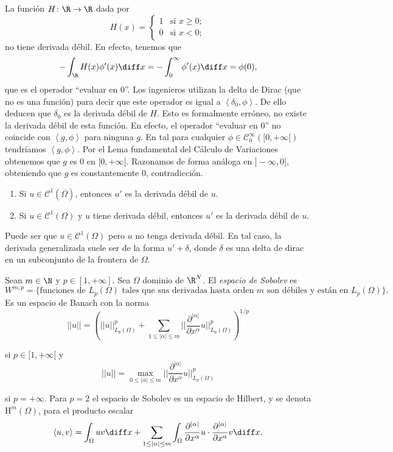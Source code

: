\documentclass{article}
\begin{document}
\begin{ex}
  La función $H \colon \R \to \R$ dada por
  \[ H(x) =
    \begin{cases}
      1 & \text{si } x \ge 0; \\
      0 & \text{si } x < 0;
    \end{cases}
  \]
  no tiene derivada débil. En efecto, tenemos que
  \[ - \int_{\R} H(x)\phi'(x) \diff x = - \int_0^{\infty} \phi'(x) \diff x = \phi(0),\] que es el
  operador ``evaluar en $0$''. Los ingenieros utilizan la delta de Dirac (que no es una función)
  para decir que este operador es igual a $\left\langle \delta_0, \phi \right\rangle$. De ello
  deducen que $\delta_0$ es la derivada débil de $H$. Esto es formalmente erróneo, no existe la
  derivada débil de esta función. En efecto, el operador ``evaluar en $0$'' no coincide con
  $\left\langle g, \phi \right\rangle$ para ninguna $g$. En tal para cualquier
  $\phi \in \mathcal{C}_0^{\infty}([0, +\infty[)$ tendríamos $\left\langle g, \phi
  \right\rangle$. Por el Lema fundamental del Cálculo de Variaciones obtenemos que $g$ es $0$ en
  $[0,+\infty[$. Razonamos de forma análoga en $]-\infty, 0]$, obteniendo que $g$ es constantemente
  $0$, contradicción.
\end{ex}

\begin{proposition}
  \begin{enumerate}
  \item Si $u \in \mathcal{C}^1(\overline{\Omega})$, entonces $u'$ es la derivada débil de $u$.
  \item Si $u \in \mathcal{C}^1(\Omega)$ y $u$ tiene derivada débil, entonces $u'$ es la derivada
    débil de $u$.
  \end{enumerate}
\end{proposition}

Puede ser que $u \in \mathcal{C}^1(\Omega)$ pero $u$ no tenga derivada débil. En tal caso, la
derivada generalizada suele ser de la forma $u' + \delta$, donde $\delta$ es una delta de dirac en
un subconjunto de la frontera de $\Omega$.

\begin{definition}
  Sean $m \in \N$ y $p \in [1,+\infty]$. Sea $\Omega$ dominio de $\R^N$. El \emph{espacio de
    Sobolev} es
  \[ W^{m,p} = \{\text{funciones de } L_p(\Omega) \text{ tales que sus derivadas hasta orden } m
    \text{ son débiles y están en } L_p(\Omega) \}. \] Es un espacio de Banach con la norma
  \[ ||u|| = \left( ||u||^p_{L_p(\Omega)} + \sum_{1 \le |\alpha| \le m}
      ||\frac{\partial^{|\alpha|}}{\partial x^{\alpha}} u ||^p_{L_p(\Omega)} \right)^{1/p} \]

  si $p \in [1, +\infty[$ y
  \[ ||u|| = \max_{0 \le |\alpha| \le m} ||\frac{\partial^{|\alpha|}}{\partial x^{\alpha}} u
    ||^p_{L_p(\Omega)} \]

  si $p = +\infty$. Para $p = 2$ el espacio de Sobolev es un espacio de Hilbert, y se denota
  $\mathrm{H}^m(\Omega)$, para el producto escalar
  \[ \left\langle u, v \right\rangle = \int_{\Omega} uv \diff x + \sum_{1 \le |\alpha| \le m}
    \int_{\Omega} \frac{\partial^{|\alpha|}}{\partial x^{\alpha}} u \cdot
    \frac{\partial^{|\alpha|}}{\partial x^{\alpha}} v \diff x.\]
\end{definition}
\end{document}
